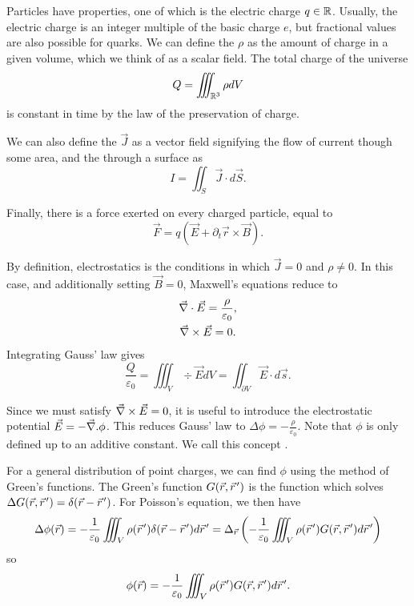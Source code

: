 
Particles have properties, one of which is the electric charge $q \in \mathbb{R}$.
Usually, the electric charge is an integer multiple of the basic charge $e$, but
fractional values are also possible for quarks.
We can define the  $\rho$ as the amount of charge in a
given volume, which we think of as a scalar field.
The total charge of the universe
\[
  Q = \iiint_{\mathbb{R}^3} \rho dV
\]
is constant in time by the law of the preservation of charge.

We can also define the  $\vec{J}$ as a vector field
signifying the flow of current though some area, and the 
through a surface as
\[
  I = \iint_S \vec{J} \cdot d\vec{S}.
\]

Finally, there is a force exerted on every charged particle, equal to
\[
  \vec{F} = q(\vec{E} + \partial_t \vec{r} \times \vec{B}).
\]


By definition, electrostatics is the conditions in which $\vec{J} = 0$ and $\rho
\ne 0$.
In this case, and additionally setting $\vec{B} = 0$, Maxwell's equations reduce
to
\begin{gather*}
  \vec{\nabla}{} \cdot \vec{E} = \frac{\rho}{\varepsilon_0}, \\
  \vec{\nabla}{} \times \vec{E} = 0.
\end{gather*}
Integrating Gauss' law gives
\[
  \frac{Q}{\varepsilon_0} = \iiint_V \div \vec{E} dV = \iint_{\partial V}
  \vec{E} \cdot d\vec{s}.
\]

Since we must satisfy $\vec{\nabla}{} \times \vec{E} = 0$, it is useful to introduce the
electrostatic potential $\vec{E} = - \vec{\nabla}{} . \phi$.
This reduces Gauss' law to $\Delta \phi = - \frac{\rho}{\varepsilon_0}$.
Note that $\phi$ is only defined up to an additive constant.
We call this concept .

For a general distribution of point charges, we can find $\phi$ using the method
of Green's functions.
The Green's function $G(\vec{r}, \pvec{r}')$ is the function which solves
$\Delta G(\vec{r}, \pvec{r}') = \delta(\vec{r} - \pvec{r}')$.
For Poisson's equation, we then have
\[
  \Delta \phi(\vec{r}) = - \inv{\varepsilon_0} \iiint_V \rho(\pvec{r}')
  \delta(\vec{r} - \pvec{r}') d\pvec{r}'
  = \Delta_{\vec{r}} \left(
	-\inv{\varepsilon_0} \iiint_V \rho(\pvec{r}') G(\vec{r}, \pvec{r}') d\pvec{r}'
  \right)
\]
so
\[
  \phi(\vec{r}) = -\inv{\varepsilon_0} \iiint_V \rho(\pvec{r}') G(\vec{r},
  \pvec{r}') d\pvec{r}'.
\]

